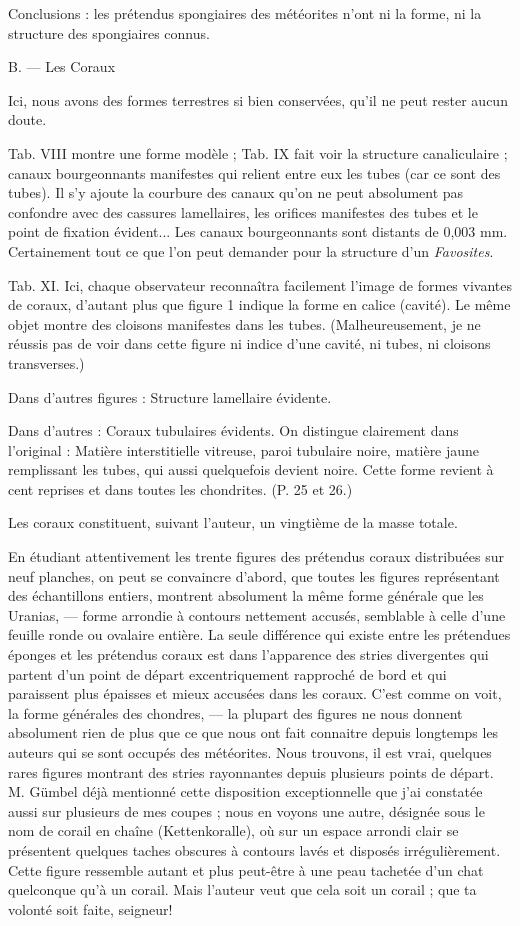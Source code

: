 \documentclass[a4paper, 12pt, oneside, french]{book}
\begin{document}
Conclusions : les prétendus spongiaires des météorites n'ont ni la forme, ni la structure des spongiaires connus.

\og B. --- Les Coraux \fg

\og Ici, nous avons des formes terrestres si bien conservées, qu'il ne peut rester aucun doute. \fg

\og Tab. VIII montre une forme modèle ; Tab. IX fait voir la structure canaliculaire ; canaux bourgeonnants manifestes qui relient entre eux les tubes (car ce sont des tubes). Il s'y ajoute la courbure des canaux qu'on ne peut absolument pas confondre avec des cassures lamellaires, les orifices manifestes des tubes et le point de fixation évident... Les canaux bourgeonnants sont distants de 0,003 mm. Certainement tout ce que l'on peut demander pour la structure d'un \emph{Favosites}. \fg

\og Tab. XI. Ici, chaque observateur reconnaîtra facilement l'image de formes vivantes de coraux, d'autant plus que figure 1 indique la forme en calice (cavité). Le même objet montre des cloisons manifestes dans les tubes. \fg (Malheureusement, je ne réussis pas de voir dans cette figure ni indice d'une cavité, ni tubes, ni cloisons transverses.)

Dans d'autres figures : \og Structure lamellaire évidente. \fg

Dans d'autres : \og Coraux tubulaires évidents. On distingue clairement dans l'original : Matière interstitielle vitreuse, paroi tubulaire noire, matière jaune remplissant les tubes, qui aussi quelquefois devient noire. Cette forme revient à cent reprises et dans toutes les chondrites. \fg (P. 25 et 26.)

Les coraux constituent, suivant l'auteur, un vingtième de la masse totale.

En étudiant attentivement les trente figures des prétendus coraux distribuées sur neuf planches, on peut se convaincre d'abord, que toutes les figures représentant des échantillons entiers, montrent absolument la même forme générale que les Uranias, --- forme arrondie à contours nettement accusés, semblable à celle d'une feuille ronde ou ovalaire entière. La seule différence qui existe entre les prétendues éponges et les prétendus coraux est dans l'apparence des stries divergentes qui partent d'un point de départ excentriquement rapproché de bord et qui paraissent plus épaisses et mieux accusées dans les coraux. C'est comme on voit, la forme générales des chondres, --- la plupart des figures ne nous donnent absolument rien de plus que ce que nous ont fait connaitre depuis longtemps les auteurs qui se sont occupés des météorites. Nous trouvons, il est vrai, quelques rares figures montrant des stries rayonnantes depuis plusieurs points de départ. M. Gümbel déjà mentionné cette disposition exceptionnelle que j'ai constatée aussi sur plusieurs de mes coupes ; nous en voyons une autre, désignée sous le nom de \og corail en chaîne \fg (Kettenkoralle), où sur un espace arrondi clair se présentent quelques taches obscures à contours lavés et disposés irrégulièrement. Cette figure ressemble autant et plus peut-être à une peau tachetée d'un chat quelconque qu'à un corail. Mais l'auteur veut que cela soit un corail ; que ta volonté soit faite, seigneur!
\end{document}
